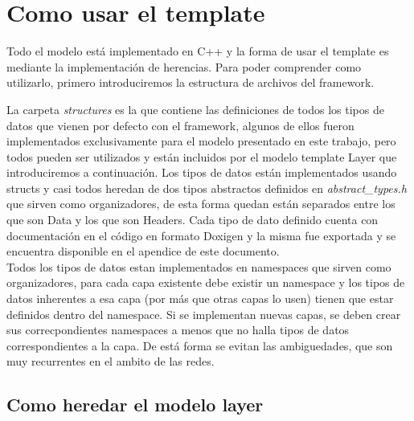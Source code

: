 \documentclass[10pt,a4paper]{article}
\begin{document}
\section{Como usar el template}

Todo el modelo está implementado en C++ y la forma de usar el template es mediante la implementación de herencias. Para poder comprender como utilizarlo, primero introduciremos la estructura de archivos del framework. \\


\medskip

La carpeta \textit{structures} es la que contiene las definiciones de todos los tipos de datos que vienen por defecto con el framework, algunos de ellos fueron implementados exclusivamente para el modelo presentado en este trabajo, pero todos pueden ser utilizados y están incluidos por el modelo template Layer que introduciremos a continuación. Los tipos de datos están implementados usando structs y casi todos heredan de dos tipos abstractos definidos en \textit{abstract\_types.h} que sirven como organizadores, de esta forma quedan están separados entre los que son Data y los que son Headers. Cada tipo de dato definido cuenta con documentación en el código en formato Doxigen y la misma fue exportada y se encuentra disponible en el apendice de este documento. \\

Todos los tipos de datos estan implementados en namespaces que sirven como organizadores, para cada capa existente debe existir un namespace y los tipos de datos inherentes a esa capa (por más que otras capas lo usen) tienen que estar definidos dentro del namespace. Si se implementan nuevas capas, se deben crear sus correcpondientes namespaces a menos que no halla tipos de datos correspondientes a la capa. De está forma se evitan las ambiguedades, que son muy recurrentes en el ambito de las redes.

\subsection{Como heredar el modelo layer}
\end{document}
